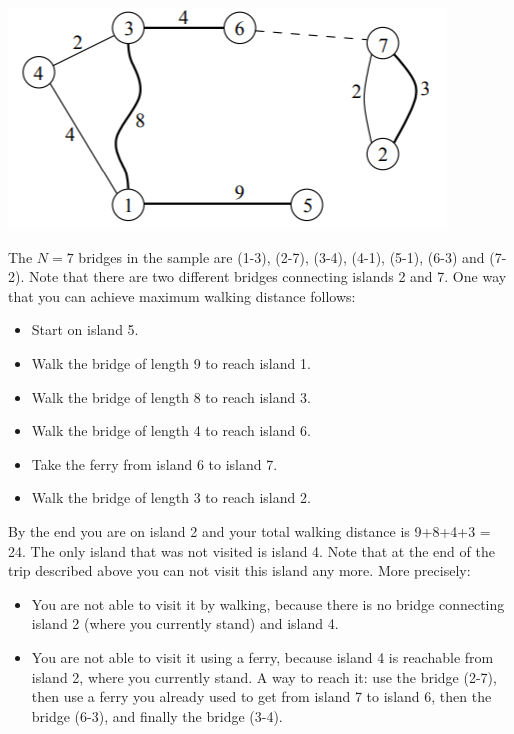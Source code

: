 \includegraphics{islands.png}

The $N=7$ bridges in the sample are (1-3), (2-7), (3-4), (4-1), (5-1), (6-3) and (7-2). Note that there are two different bridges connecting islands 2 and 7.
One way that you can achieve maximum walking distance follows:
\begin{itemize}
\item Start on island 5.  
\item Walk the bridge of length 9 to reach island 1.
\item Walk the bridge of length 8 to reach island 3.
\item Walk the bridge of length 4 to reach island 6.
\item Take the ferry from island 6 to island 7.
\item Walk the bridge of length 3 to reach island 2. 
\end{itemize}

By the end you are on island 2 and your total walking distance is 9+8+4+3 = 24. The only island that was not visited is island 4. Note that at the end of the trip described above you can not visit this island any more. More precisely:
\begin{itemize}
\item You are not able to visit it by walking, because there is no bridge connecting island 2 (where you currently stand) and island 4.
\item You are not able to visit it using a ferry, because island 4 is reachable from island 2, where you currently stand. A way to reach it: use the bridge (2-7), then use a ferry you already used to get from island 7 to island 6, then the bridge (6-3), and finally the bridge (3-4).
\end{itemize}